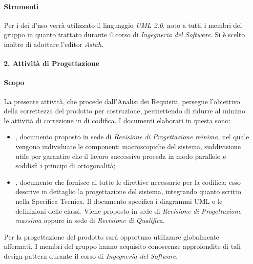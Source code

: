 			\paragraph*{Strumenti}
				Per i  dei  d'uso verrà utilizzato il linguaggio \textit{UML 2.0},
				noto a tutti i membri del gruppo in quanto trattato durante il corso
				di \textit{Ingegneria del Software}.
				Si \`e scelto inoltre di adottare l'editor  \textit{Astah}.   %
			
			
		\paragraph*{2. Attività di Progettazione}
			\paragraph*{Scopo}
		        La presente attivit\`a, che procede dall'Analisi dei Requisiti, persegue l'obiettivo
		        della correttezza del prodotto per costruzione, permettendo di ridurre al minimo le attività di correzione
		        in  di codifica.
                        I documenti elaborati in questa  sono:
                        \begin{itemize}
                        \item {}, documento proposto in sede di \textit{Revisione di Progettazione minima}, nel quale vengono individuate 
			 le componenti macroscopiche del sistema, suddivisione utile per garantire che il lavoro successivo proceda in modo parallelo e soddisfi i principi di ortogonalità;
                        \item {}, documento che fornisce ai  tutte le direttive necessarie per la codifica;
					    esso descrive in dettaglio la progettazione del sistema, integrando quanto scritto nella Specifica Tecnica. Il documento specifica i diagrammi UML e le
					    definizioni delle classi. Viene proposto in sede di \textit{Revisione di Progettazione massima} oppure in sede di \textit{Revisione di Qualifica}.
                        \end{itemize}
		        Per la progettazione del prodotto sarà opportuno utilizzare  globalmente affermati.
			I membri del gruppo hanno acquisito conoscenze approfondite di tali design pattern durante il corso di \textit{Ingegneria del Software}.
                 
